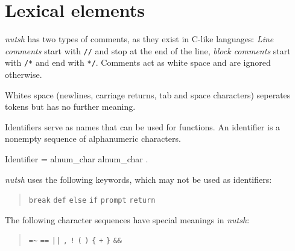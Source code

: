 \documentclass[paper=a4,twoside,abstract=on,cleardoublepage=empty,numbers=noenddot,toc=bib,12pt,appendixprefix=true]{scrreprt}
\begin{document}
\section{Lexical elements}


\emph{nutsh} has two types of comments, as they exist in C-like languages: \emph{Line comments} start with \texttt{//} and stop at the end of the line, \emph{block comments} start with \texttt{/*} and end with \texttt{*/}. Comments act as white space and are ignored otherwise.


Whites space (newlines, carriage returns, tab and space characters) seperates tokens but has no further meaning.


Identifiers serve as names that can be used for functions. An identifier is a nonempty sequence of alphanumeric characters.

\begin{ebnf}
Identifier = alnum_char { alnum_char } .
\end{ebnf}


\emph{nutsh} uses the following keywords, which may not be used as identifiers:

\begin{quote}
    \texttt{break}\hspace{0.5em}
    \texttt{def}\hspace{0.5em}
    \texttt{else}\hspace{0.5em}
    \texttt{if}\hspace{0.5em}
    \texttt{prompt}\hspace{0.5em}
    \texttt{return}
\end{quote}


The following character sequences have special meanings in \emph{nutsh}:

\begin{quote}
    \texttt{=\~}\hspace{1em}
    \texttt{==}\hspace{1em}
    \texttt{||}\hspace{1em}
    \texttt{,}\hspace{1em}
    \texttt{!}\hspace{1em}
    \texttt{(}\hspace{1em}
    \texttt{)}\hspace{1em}
    \texttt{\{}\hspace{1em}
    \texttt{+}\hspace{1em}
    \texttt{\}}\hspace{1em}
    \texttt{\&\&}
\end{quote}
\end{document}
